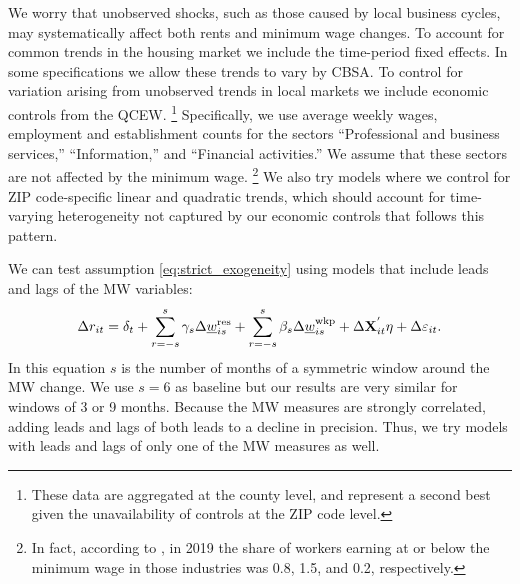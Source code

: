 We worry that unobserved shocks, such as those caused by local business cycles, 
may systematically affect both rents and minimum wage changes.
To account for common trends in the housing market we include the time-period
fixed effects.
In some specifications we allow these trends to vary by CBSA.
To control for variation arising from unobserved trends in local markets we 
include economic controls from the QCEW.%
\footnote{These data are aggregated at the county level, and represent a second 
best given the unavailability of controls at the ZIP code level.}
Specifically, we use average weekly wages, employment and establishment counts 
for the sectors ``Professional and business services,'' ``Information,'' and 
``Financial activities.''
We assume that these sectors are not affected by the minimum wage.%
\footnote{In fact, according to \textcite[][table 5]{MinWorkersReportBLS}, in 
2019 the share of workers earning at or below the minimum wage in those 
industries was 0.8, 1.5, and 0.2, respectively.}
We also try models where we control for ZIP code-specific linear and quadratic 
trends, which should account for time-varying heterogeneity not captured by our 
economic controls that follows this pattern.

We can test assumption \eqref{eq:strict_exogeneity} using models that include 
leads and lags of the MW variables:
\begin{equation} \label{eq:leads_lags}
    \Delta r_{it} = \delta_t
                  + \sum_{r=-s}^{s} \gamma_s \Delta \underline{w}^{\text{res}}_{is} 
                  + \sum_{r=-s}^{s} \beta_s \Delta \underline{w}^{\text{wkp}}_{is}
                  + \Delta \mathbf{X}^{'}_{it}\eta
                  + \Delta \varepsilon_{it} .
\end{equation}
In this equation $s$ is the number of months of a symmetric window around the 
MW change.
We use $s=6$ as baseline but our results are very similar for windows of 3 or 9 
months.
Because the MW measures are strongly correlated, adding leads and lags of both 
leads to a decline in precision.
Thus, we try models with leads and lags of only one of the MW measures as well.

